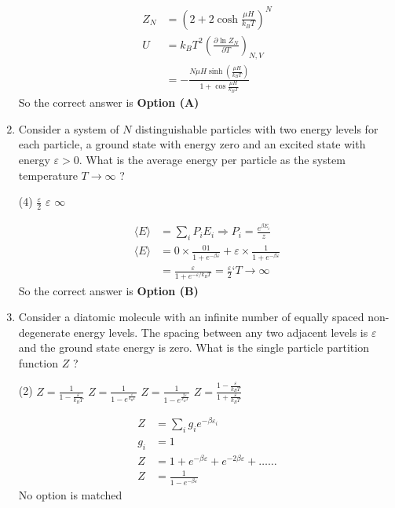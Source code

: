 \begin{enumerate}
\begin{answer}
\begin{align*}
		Z_{N}&=\left(2+2 \cosh \frac{\mu H}{k_{B} T}\right)^{N}\\U&=k_{B} T^{2}\left(\frac{\partial \ln Z_{N}}{\partial T}\right)_{N, V}\\&=-\frac{N \mu H \sinh \left(\frac{\mu H}{k_{B} T}\right)}{1+\cos \frac{\mu H}{k_{B} T}}
		\end{align*}
		So the correct answer is \textbf{Option (A)}
	\end{answer}
	\item 	Consider a system of $N$ distinguishable particles with two energy levels for each particle, a ground state with energy zero and an excited state with energy $\varepsilon>0$. What is the average energy per particle as the system temperature $T \rightarrow \infty$ ?
	{}
	\begin{tasks}(4)
		\task[\textbf{B.}]  $\frac{\varepsilon}{2}$
		\task[\textbf{C.}] $\varepsilon$
		\task[\textbf{D.}] $\infty$
	\end{tasks}
	\begin{answer}
		\begin{align*}
		\langle E\rangle&=\sum_{i} P_{i} E_{i} \Rightarrow P_{i}=\frac{e^{\beta E_{i}}}{z}\\
		\langle E\rangle&=0 \times \frac{01}{1+e^{-\beta \varepsilon}}+\varepsilon \times \frac{1}{1+e^{-\beta \varepsilon}}\\
		&=\frac{\varepsilon}{1+e^{-\varepsilon / k_{B} T}}=\frac{\varepsilon}{2}\text{`}T \rightarrow \infty
		\end{align*}
		So the correct answer is \textbf{Option (B)}
	\end{answer}
	\item Consider a diatomic molecule with an infinite number of equally spaced non-degenerate energy levels. The spacing between any two adjacent levels is $\varepsilon$ and the ground state energy is zero. What is the single particle partition function $Z$ ?
	{}
	\begin{tasks}(2)
		\task[\textbf{A.}] $Z=\frac{1}{1-\frac{\varepsilon}{k_{B} T}}$
		\task[\textbf{B.}] $Z=\frac{1}{1-e^{\frac{\varepsilon}{k_{\mathrm{B}} T}}}$
		\task[\textbf{C.}] $Z=\frac{1}{1-e^{\frac{2 \varepsilon}{k_{B} T}}}$
		\task[\textbf{D.}] $Z=\frac{1-\frac{\varepsilon}{k_{B} T}}{1+\frac{\varepsilon}{k_{B} T}}$
	\end{tasks}
	\begin{answer}
		\begin{align*}
		Z&=\sum_{i} g_{i} e^{-\beta \varepsilon_{i}}\\
		g_{i}&=1\\
		Z&=1+e^{-\beta \varepsilon}+e^{-2 \beta \varepsilon}+\ldots \ldots\\
		Z&=\frac{1}{1-e^{-\beta \varepsilon}}
		\end{align*}
		No option is matched
	\end{answer}	
\end{enumerate}